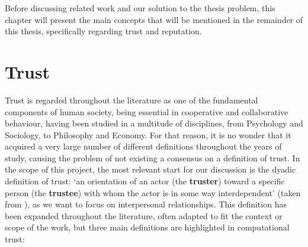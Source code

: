 \label{chap:Background}
Before discussing related work and our solution to the thesis problem, this chapter will present the main concepts that will be mentioned in the remainder of this thesis, specifically regarding trust and reputation.

\section{Trust}
\label{sec:Trust}
Trust is regarded throughout the literature as one of the fundamental components of human society, being essential in cooperative and collaborative behaviour, having been studied in a multitude of disciplines, from Psychology and Sociology, to Philosophy and Economy\cite{Rousseau1998, Jones1997, Sabater2005}. For that reason, it is no wonder that it acquired a very large number of different definitions throughout the years of study, causing the problem of not existing a consensus on a definition of trust\cite{Castelfranchi2010}. In the scope of this project, the most relevant start for our discussion is the dyadic definition of trust: `an orientation of an actor (the \textbf{truster}) toward a specific person (the \textbf{trustee}) with whom the actor is in some way interdependent' (taken from \cite{Simpson2007}), as we want to focus on interpersonal relationships. This definition has been expanded throughout the literature, often adapted to fit the context or scope of the work, but three main definitions are highlighted in computational trust:
